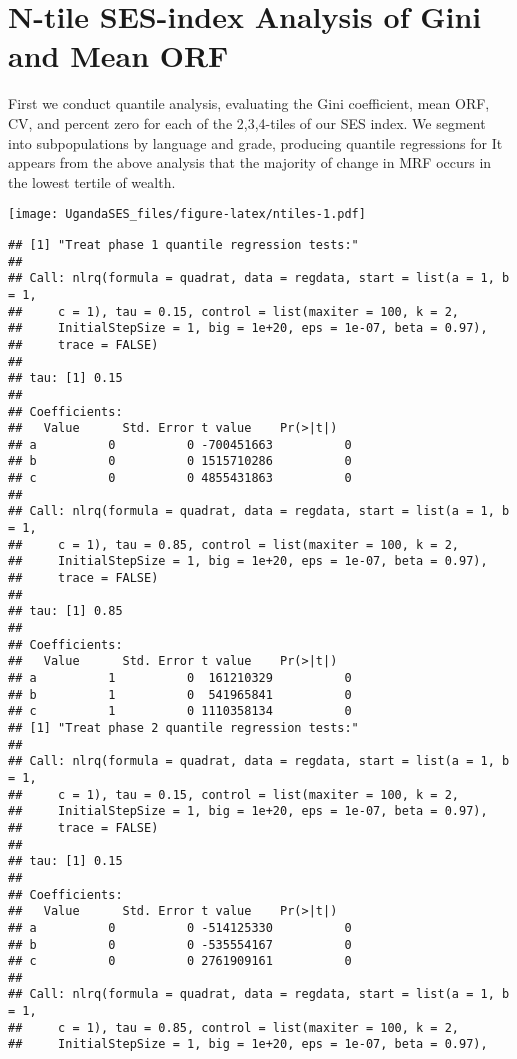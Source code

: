 \documentclass[
]{article}
\begin{document}
\hypertarget{n-tile-ses-index-analysis-of-gini-and-mean-orf}{%
\section{N-tile SES-index Analysis of Gini and Mean
ORF}\label{n-tile-ses-index-analysis-of-gini-and-mean-orf}}

First we conduct quantile analysis, evaluating the Gini coefficient,
mean ORF, CV, and percent zero for each of the 2,3,4-tiles of our SES
index. We segment into subpopulations by language and grade, producing
quantile regressions for It appears from the above analysis that the
majority of change in MRF occurs in the lowest tertile of wealth.

\texttt{[image: UgandaSES\_files/figure-latex/ntiles-1.pdf]}

\begin{verbatim}
## [1] "Treat phase 1 quantile regression tests:"
## 
## Call: nlrq(formula = quadrat, data = regdata, start = list(a = 1, b = 1, 
##     c = 1), tau = 0.15, control = list(maxiter = 100, k = 2, 
##     InitialStepSize = 1, big = 1e+20, eps = 1e-07, beta = 0.97), 
##     trace = FALSE)
## 
## tau: [1] 0.15
## 
## Coefficients:
##   Value      Std. Error t value    Pr(>|t|)  
## a          0          0 -700451663          0
## b          0          0 1515710286          0
## c          0          0 4855431863          0
## 
## Call: nlrq(formula = quadrat, data = regdata, start = list(a = 1, b = 1, 
##     c = 1), tau = 0.85, control = list(maxiter = 100, k = 2, 
##     InitialStepSize = 1, big = 1e+20, eps = 1e-07, beta = 0.97), 
##     trace = FALSE)
## 
## tau: [1] 0.85
## 
## Coefficients:
##   Value      Std. Error t value    Pr(>|t|)  
## a          1          0  161210329          0
## b          1          0  541965841          0
## c          1          0 1110358134          0
## [1] "Treat phase 2 quantile regression tests:"
## 
## Call: nlrq(formula = quadrat, data = regdata, start = list(a = 1, b = 1, 
##     c = 1), tau = 0.15, control = list(maxiter = 100, k = 2, 
##     InitialStepSize = 1, big = 1e+20, eps = 1e-07, beta = 0.97), 
##     trace = FALSE)
## 
## tau: [1] 0.15
## 
## Coefficients:
##   Value      Std. Error t value    Pr(>|t|)  
## a          0          0 -514125330          0
## b          0          0 -535554167          0
## c          0          0 2761909161          0
## 
## Call: nlrq(formula = quadrat, data = regdata, start = list(a = 1, b = 1, 
##     c = 1), tau = 0.85, control = list(maxiter = 100, k = 2, 
##     InitialStepSize = 1, big = 1e+20, eps = 1e-07, beta = 0.97), 

\end{verbatim}
\end{document}
